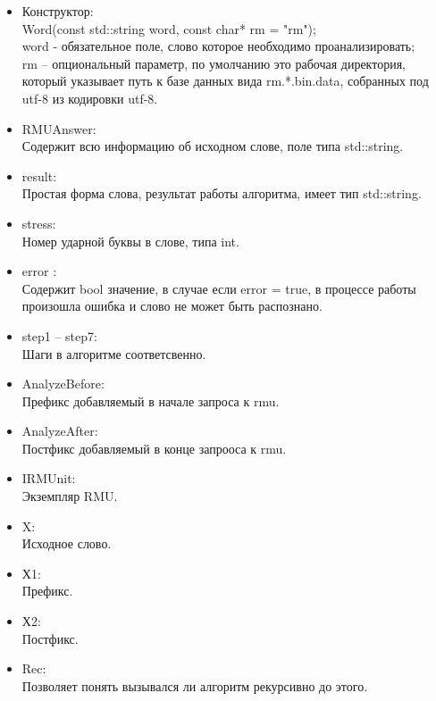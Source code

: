 \begin{itemize}
  \item Конструктор: \\
    Word(const std::string word, const char* rm = "rm"); \\
    word - обязательное поле, слово которое необходимо проанализировать; \\
    rm – опциональный параметр, по умолчанию это рабочая директория, который указывает путь к базе данных вида rm.*.bin.data, собранных под utf-8 из кодировки utf-8.
  \item RMUAnswer: \\
    Содержит всю информацию об исходном слове, поле типа std::string.
  \item result: \\
    Простая форма слова, результат работы алгоритма, имеет тип std::string.
  \item stress: \\
    Номер ударной буквы в слове, типа int.
  \item error : \\
    Содержит bool значение, в случае если error = true, в процессе работы произошла ошибка и слово не может быть распознано.
  \item step1 – step7: \\
    Шаги в алгоритме соответсвенно.
  \item AnalyzeBefore: \\
    Префикс добавляемый в начале запроса к rmu.
  \item AnalyzeAfter: \\
    Постфикс добавляемый в конце запрооса к rmu.
  \item IRMUnit: \\
    Экземпляр RMU.
  \item X: \\
    Исходное слово.
  \item Х1: \\
    Префикс.
  \item Х2: \\
    Постфикс.
  \item Rec: \\
    Позволяет понять вызывался ли алгоритм рекурсивно до этого.
\end{itemize}

\clearpage